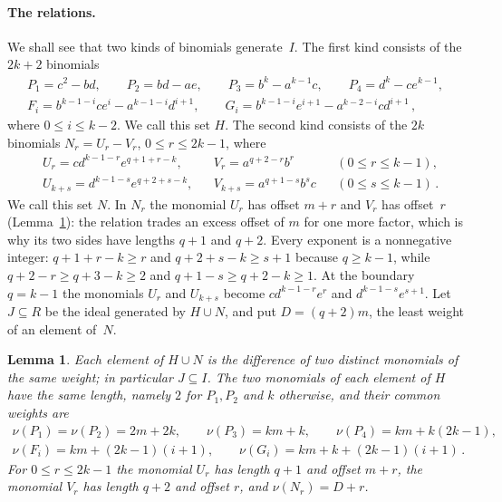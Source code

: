 \documentclass[11pt,letterpaper]{article}
\numberwithin{equation}{section}
\theoremstyle{plain}
\newtheorem{lemma}[theorem]{Lemma}
\theoremstyle{remark}
\begin{document}
\paragraph{The relations.}
We shall see that two kinds of binomials generate~$I$. The first kind consists of the $2k+2$ binomials
\begin{equation}\label{eq:H}
\begin{gathered}
P_1=c^2-bd,\qquad P_2=bd-ae,\qquad P_3=b^k-a^{k-1}c,\qquad P_4=d^k-ce^{k-1},\\
F_i=b^{k-1-i}ce^{i}-a^{k-1-i}d^{i+1},\qquad G_i=b^{k-1-i}e^{i+1}-a^{k-2-i}cd^{i+1}\,,
\end{gathered}
\end{equation}
where $0\le i\le k-2$. We call this set $H$. The second kind consists of the $2k$ binomials $N_r=U_r-V_r$, $0\le r\le 2k-1$, where
\begin{equation}\label{eq:N}
\begin{aligned}
&U_r=cd^{k-1-r}e^{q+1+r-k}, && V_r=a^{q+2-r}b^{r} && (0\le r\le k-1),\\
&U_{k+s}=d^{k-1-s}e^{q+2+s-k}, && V_{k+s}=a^{q+1-s}b^{s}c && (0\le s\le k-1)\,.
\end{aligned}
\end{equation}
We call this set $N$. In $N_r$ the monomial $U_r$ has offset $m+r$ and $V_r$ has offset~$r$ (Lemma~\ref{lem:relations}): the relation trades an excess offset of $m$ for one more factor, which is why its two sides have lengths $q+1$ and $q+2$. Every exponent is a nonnegative integer: $q+1+r-k\ge r$ and $q+2+s-k\ge s+1$ because $q\ge k-1$, while $q+2-r\ge q+3-k\ge 2$ and $q+1-s\ge q+2-k\ge 1$. At the boundary $q=k-1$ the monomials $U_r$ and $U_{k+s}$ become $cd^{k-1-r}e^{r}$ and $d^{k-1-s}e^{s+1}$. Let $J\subseteq R$ be the ideal generated by $H\cup N$, and put $D=(q+2)m$, the least weight of an element of~$N$.

\begin{lemma}\label{lem:relations}
Each element of $H\cup N$ is the difference of two distinct monomials of the same weight; in particular $J\subseteq I$. The two monomials of each element of $H$ have the same length, namely $2$ for $P_1,P_2$ and $k$ otherwise, and their common weights are
\begin{equation}\label{eq:Hweights}
\begin{gathered}
\nu(P_1)=\nu(P_2)=2m+2k,\qquad \nu(P_3)=km+k,\qquad \nu(P_4)=km+k(2k-1),\\
\nu(F_i)=km+(2k-1)(i+1),\qquad \nu(G_i)=km+k+(2k-1)(i+1)\,.
\end{gathered}
\end{equation}
For $0\le r\le 2k-1$ the monomial $U_r$ has length $q+1$ and offset $m+r$, the monomial $V_r$ has length $q+2$ and offset $r$, and $\nu(N_r)=D+r$.
\end{lemma}
\end{document}
